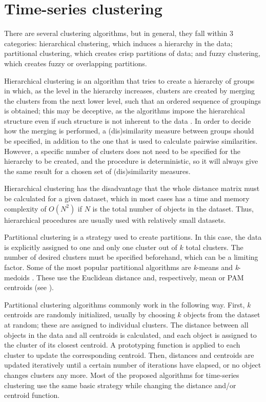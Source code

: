 \FloatBarrier
\section{Time-series clustering}
\label{sec:clustering}

There are several clustering algorithms,
but in general,
they fall within 3 categories:
hierarchical clustering,
which induces a hierarchy in the data;
partitional clustering,
which creates crisp partitions of data;
and fuzzy clustering,
which creates fuzzy or overlapping partitions.

Hierarchical clustering is an algorithm that tries to create a hierarchy of groups in which,
as the level in the hierarchy increases,
clusters are created by merging the clusters from the next lower level,
such that an ordered sequence of groupings is obtained;
this may be deceptive,
as the algorithms impose the hierarchical structure even if such structure is not inherent to the data \citep{hastie2009}.
In order to decide how the merging is performed,
a (dis)similarity measure between groups should be specified,
in addition to the one that is used to calculate pairwise similarities.
However, a specific number of clusters does not need to be specified for the hierarchy to be created,
and the procedure is deterministic,
so it will always give the same result for a chosen set of (dis)similarity measures.

Hierarchical clustering has the disadvantage that the whole distance matrix must be calculated for a given dataset,
which in most cases has a time and memory complexity of $O(N^2)$ if $N$ is the total number of objects in the dataset.
Thus, hierarchical procedures are usually used with relatively small datasets.

Partitional clustering is a strategy used to create partitions.
In this case, the data is explicitly assigned to one and only one cluster out of $k$ total clusters.
The number of desired clusters must be specified beforehand,
which can be a limiting factor.
Some of the most popular partitional algorithms are \textit{k}-means and \textit{k}-medoids \citep{hastie2009}.
These use the Euclidean distance and, respectively, mean or PAM centroids (see ).

Partitional clustering algorithms commonly work in the following way.
First, $k$ centroids are randomly initialized,
usually by choosing $k$ objects from the dataset at random;
these are assigned to individual clusters.
The distance between all objects in the data and all centroids is calculated,
and each object is assigned to the cluster of its closest centroid.
A prototyping function is applied to each cluster to update the corresponding centroid.
Then, distances and centroids are updated iteratively until a certain number of iterations have elapsed,
or no object changes clusters any more.
Most of the proposed algorithms for time-series clustering use the same basic strategy while changing the distance and/or centroid function.

